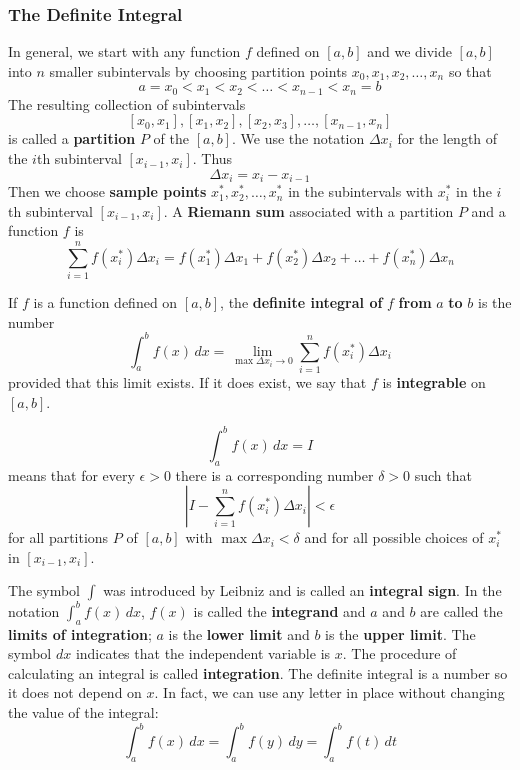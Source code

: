 \subsubsection*{The Definite Integral}
In general, we start with any function \(f\) defined on \([a,b]\) and we
divide \([a,b]\) into \(n\) smaller subintervals by choosing partition points
\(x_0,x_1,x_2,\dots,x_n\) so that
\[a=x_0<x_1<x_2<\dots<x_{n-1}<x_n=b\]
The resulting collection of subintervals
\[[x_0,x_1],[x_1,x_2],[x_2,x_3],\dots,[x_{n-1},x_n]\]
is called a \textbf{partition} \(P\) of the \([a,b]\).
We use the notation \(\Delta x_i\) for the length of the \(i\)th subinterval
\([x_{i-1},x_i]\).
Thus
\[\Delta x_i=x_i-x_{i-1}\]
Then we choose \textbf{sample points} \(x_1^*,x_2^*,\dots,x_n^*\) in the
subintervals with \(x_i^*\) in the \(i\)th subinterval \([x_{i-1},x_i]\).
A \textbf{Riemann sum} associated with a partition \(P\) and a function \(f\)
is
\[\sum_{i=1}^n f(x_i^*)\Delta x_i=f(x_1^*)\Delta x_1+f(x_2^*)\Delta x_2
+\dots+f(x_n^*)\Delta x_n\]
\begin{definition}
    If \(f\) is a function defined on \([a,b]\),
    the \textbf{definite integral of} \(f\) \textbf{from} \(a\) \textbf{to}
    \(b\) is the number
    \[\int_a^b f(x)\,dx=\lim_{\max\Delta x_i\to 0}
    \sum_{i=1}^n f(x_i^*)\Delta x_i\]
    provided that this limit exists.
    If it does exist, we say that \(f\) is \textbf{integrable} on \([a,b]\).
\end{definition}
\begin{definition}
    \[\int_a^b f(x)\,dx=I\]
    means that for every \(\epsilon>0\) there is a corresponding number
    \(\delta>0\) such that
    \[\left\lvert I-\sum_{i=1}^n f(x_i^*)\Delta x_i\right\rvert<\epsilon\]
    for all partitions \(P\) of \([a,b]\) with \(\max\Delta x_i<\delta\) and
    for all possible choices of \(x_i^*\) in \([x_{i-1},x_i]\).
\end{definition}
The symbol \(\displaystyle{\int}\) was introduced by Leibniz and is called an
\textbf{integral sign}.
In the notation \(\displaystyle{\int_a^b f(x)\,dx}\), \(f(x)\) is called the
\textbf{integrand} and \(a\) and \(b\) are called the
\textbf{limits of integration}; \(a\) is the \textbf{lower limit} and \(b\) is the
\textbf{upper limit}.
The symbol \(dx\) indicates that the independent variable is \(x\).
The procedure of calculating an integral is called \textbf{integration}.
The definite integral is a number so it does not depend on \(x\).
In fact, we can use any letter in place without changing the value of the
integral:
\[\int_a^b f(x)\,dx=\int_a^b f(y)\,dy=\int_a^b f(t)\,dt\]
